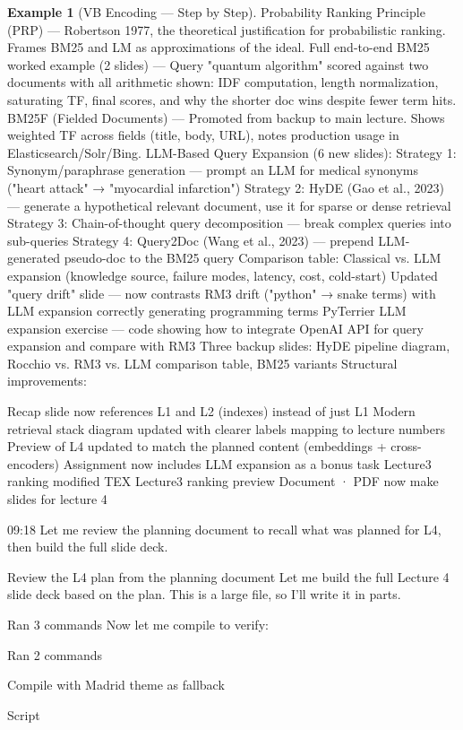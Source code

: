 \documentclass[aspectratio=169]{beamer} \usetheme{TUDelft} %
\theoremstyle{definition}
\newtheorem{example}{Example}[section]
\theoremstyle{plain}
\begin{document}
\begin{example}[VB Encoding --- Step by Step]
Probability Ranking Principle (PRP) — Robertson 1977, the theoretical justification for probabilistic ranking. Frames BM25 and LM as approximations of the ideal.
Full end-to-end BM25 worked example (2 slides) — Query "quantum algorithm" scored against two documents with all arithmetic shown: IDF computation, length normalization, saturating TF, final scores, and why the shorter doc wins despite fewer term hits.
BM25F (Fielded Documents) — Promoted from backup to main lecture. Shows weighted TF across fields (title, body, URL), notes production usage in Elasticsearch/Solr/Bing.
LLM-Based Query Expansion (6 new slides):
Strategy 1: Synonym/paraphrase generation — prompt an LLM for medical synonyms ("heart attack" → "myocardial infarction")
Strategy 2: HyDE (Gao et al., 2023) — generate a hypothetical relevant document, use it for sparse or dense retrieval
Strategy 3: Chain-of-thought query decomposition — break complex queries into sub-queries
Strategy 4: Query2Doc (Wang et al., 2023) — prepend LLM-generated pseudo-doc to the BM25 query
Comparison table: Classical vs. LLM expansion (knowledge source, failure modes, latency, cost, cold-start)
Updated "query drift" slide — now contrasts RM3 drift ("python" → snake terms) with LLM expansion correctly generating programming terms
PyTerrier LLM expansion exercise — code showing how to integrate OpenAI API for query expansion and compare with RM3
Three backup slides: HyDE pipeline diagram, Rocchio vs. RM3 vs. LLM comparison table, BM25 variants
Structural improvements:

Recap slide now references L1 and L2 (indexes) instead of just L1
Modern retrieval stack diagram updated with clearer labels mapping to lecture numbers
Preview of L4 updated to match the planned content (embeddings + cross-encoders)
Assignment now includes LLM expansion as a bonus task
Lecture3 ranking modified
TEX 
Lecture3 ranking preview
Document · PDF 
now make slides for lecture 4

09:18
Let me review the planning document to recall what was planned for L4, then build the full slide deck.


Review the L4 plan from the planning document
Let me build the full Lecture 4 slide deck based on the plan. This is a large file, so I'll write it in parts.


Ran 3 commands
Now let me compile to verify:


Ran 2 commands

Compile with Madrid theme as fallback

Script


\end{example}
\end{document}
